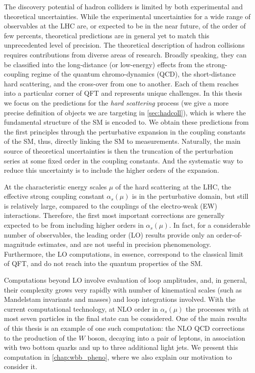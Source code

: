 The discovery potential of hadron colliders is limited by both experimental and theoretical uncertainties.
While the experimental uncertainties for a wide range of observables at the LHC are, or expected to be in the near future, of the order of few percents,
theoretical predictions are in general yet to match this unprecedented level of precision.
The theoretical description of hadron collisions requires contributions from diverse areas of research.
Broadly speaking, they can be classified into the long-distance (or low-energy) effects from 
the strong-coupling regime of the quantum chromo-dynamics (QCD), the short-distance hard scattering, and
the cross-over from one to another.
Each of them reaches into a particular corner of QFT and represents unique challenges.
In this thesis we focus on the predictions for the \emph{hard scattering} process (we give a more precise definition of objects we are targeting in \cref{sec:hadcoll}),
which is where the fundamental structure of the SM is encoded to.
We obtain these predictions from the first principles through the perturbative expansion in the coupling constants of the SM, thus, directly linking the SM to measurements.
Naturally, the main source of theoretical uncertainties is then the truncation
of the perturbation series at some fixed order in the coupling constants.
And the systematic way to reduce this uncertainty is to include the higher orders of the expansion.

At the characteristic energy scales $\mu$ of the hard scattering at the LHC, the effective strong coupling constant $\alpha_s(\mu)$
is in the perturbative domain, but still is relatively large, compared to the couplings of the electro-weak (EW) interactions.
Therefore, the first most important corrections are generally expected to be from including higher orders in $\alpha_s(\mu)$.
In fact, for a considerable number of observables,
the leading order (LO) results provide only an order-of-magnitude estimates, and are not useful in precision phenomenology.
Furthermore, the LO computations, in essence, correspond to the classical limit of QFT, and do not reach into the quantum properties of the SM.

Computations beyond LO involve evaluation of loop amplitudes, and, in general,
their complexity grows very rapidly with number of kinematical scales (such as Mandelstam invariants and masses)  and loop integrations involved.
With the current computational technology, at NLO order in $\alpha_s(\mu)$ the processes with at most seven particles in the final state
can be considered. One of the main results of this thesis is an example of one such computation:
the NLO QCD corrections to the production of the $W$ boson, decaying into a pair of leptons, in association with 
two bottom quarks and up to three additional light jets. We present this computation in \cref{chap:wbb_pheno},
where we also explain our motivation to consider it.


